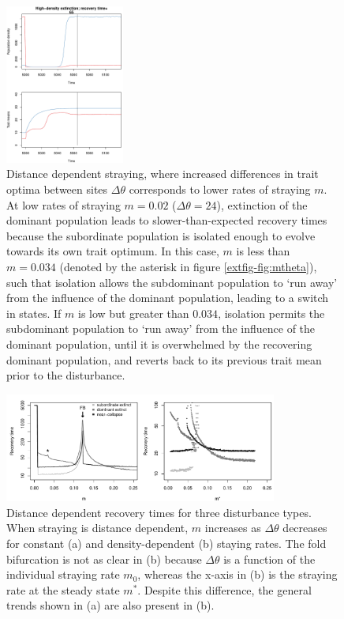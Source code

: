 \documentclass{revtex4}
\begin{document}
\begin{figure}
  \captionsetup{justification=raggedright,
singlelinecheck=false
}
\centering
\includegraphics[width=0.35\textwidth]{figs2/fig_relax_inertia.pdf}
\caption{
Distance dependent straying, where increased differences in trait optima between sites $\Delta\theta$ corresponds to lower rates of straying $m$.
At low rates of straying $m=0.02$ ($\Delta\theta=24$), extinction of the dominant population leads to slower-than-expected recovery times because the subordinate population is isolated enough to evolve towards its own trait optimum. %
In this case, $m$ is less than $m=0.034$ (denoted by the asterisk in figure \ref{extfig-fig:mtheta}), such that isolation allows the subdominant population to `run away' from the influence of the dominant population, leading to a switch in states.
If $m$ is low but greater than $0.034$, isolation permits the subdominant population to `run away' from the influence of the dominant population, until it is overwhelmed by the recovering dominant population, and reverts back to its previous trait mean prior to the disturbance.
} \label{fig:inertia}
\end{figure}

\begin{figure}
  \captionsetup{justification=raggedright,
singlelinecheck=false
}
  \centering
  \includegraphics[width=0.8\textwidth]{figs2/fig_relax_mtheta.pdf}
  \caption{
  Distance dependent recovery times for three disturbance types. When straying is distance dependent, $m$ increases as $\Delta\theta$ decreases for constant (a) and density-dependent (b) staying rates.
  The fold bifurcation is not as clear in (b) because $\Delta\theta$ is a function of the individual straying rate $m_0$, whereas the x-axis in (b) is the straying rate at the steady state $m^*$.
  Despite this difference, the general trends shown in (a) are also present in (b).
  } \label{fig:mthetamvm}
\end{figure}
\end{document}
